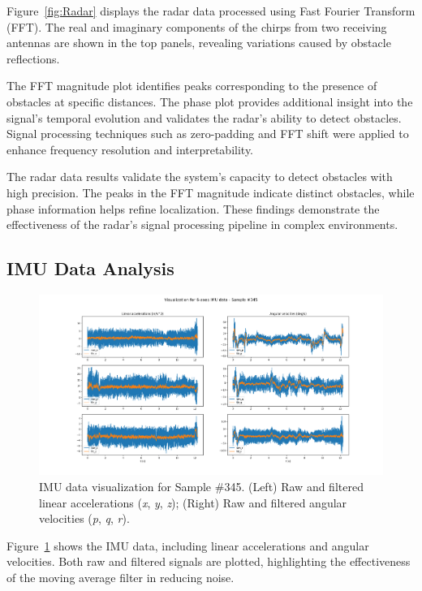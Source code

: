 \documentclass[12pt,a4paper]{article}
\begin{document}
Figure~\ref{fig:Radar} displays the radar data processed using Fast Fourier Transform (FFT). The real and imaginary components of the chirps from two receiving antennas are shown in the top panels, revealing variations caused by obstacle reflections. 

The FFT magnitude plot identifies peaks corresponding to the presence of obstacles at specific distances. The phase plot provides additional insight into the signal's temporal evolution and validates the radar's ability to detect obstacles. Signal processing techniques such as zero-padding and FFT shift were applied to enhance frequency resolution and interpretability.

The radar data results validate the system's capacity to detect obstacles with high precision. The peaks in the FFT magnitude indicate distinct obstacles, while phase information helps refine localization. These findings demonstrate the effectiveness of the radar's signal processing pipeline in complex environments.

\subsection{IMU Data Analysis}

\begin{figure}[h!]
    \centering
    \includegraphics[width=\textwidth]{test_imu_345.png}
    \caption{IMU data visualization for Sample \#345. (Left) Raw and filtered linear accelerations (\textit{x}, \textit{y}, \textit{z}); (Right) Raw and filtered angular velocities (\textit{p}, \textit{q}, \textit{r}).}
    \label{fig:IMU}
\end{figure}

Figure~\ref{fig:IMU} shows the IMU data, including linear accelerations and angular velocities. Both raw and filtered signals are plotted, highlighting the effectiveness of the moving average filter in reducing noise. 
\end{document}
